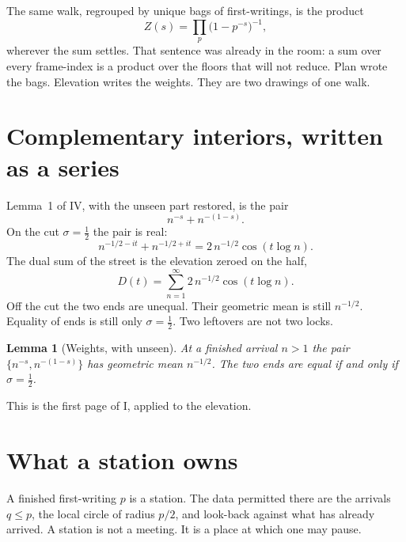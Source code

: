\documentclass[10pt,a4paper]{article}
\theoremstyle{plain}
\newtheorem{lemma}{Lemma}
\theoremstyle{definition}
\begin{document}
The same walk, regrouped by unique bags of first-writings, is the product
\begin{equation}
\label{eq:euler}
Z(s)=\prod_{p}\bigl(1-p^{-s}\bigr)^{-1},
\end{equation}
wherever the sum settles.
That sentence was already in the room: a sum over every frame-index is a product over the floors that will not reduce.
Plan wrote the bags.
Elevation writes the weights.
They are two drawings of one walk.

\section{Complementary interiors, written as a series}

Lemma~1 of IV, with the unseen part restored, is the pair
\[
n^{-s}+n^{-(1-s)}.
\]
On the cut $\sigma=\tfrac12$ the pair is real:
\begin{equation}
\label{eq:dual}
n^{-1/2-it}+n^{-1/2+it}
=2\,n^{-1/2}\cos(t\log n).
\end{equation}
The dual sum of the street is the elevation zeroed on the half,
\begin{equation}
\label{eq:dualsum}
D(t)=\sum_{n=1}^{\infty}2\,n^{-1/2}\cos(t\log n).
\end{equation}
Off the cut the two ends are unequal.
Their geometric mean is still $n^{-1/2}$.
Equality of ends is still only $\sigma=\tfrac12$.
Two leftovers are not two locks.

\begin{lemma}[Weights, with unseen]
At a finished arrival $n>1$ the pair $\{n^{-s},n^{-(1-s)}\}$ has geometric mean $n^{-1/2}$.
The two ends are equal if and only if $\sigma=\tfrac12$.
\end{lemma}

This is the first page of I, applied to the elevation.

\section{What a station owns}

A finished first-writing $p$ is a station.
The data permitted there are the arrivals $q\le p$, the local circle of radius $p/2$, and look-back against what has already arrived.
A station is not a meeting.
It is a place at which one may pause.
\end{document}

